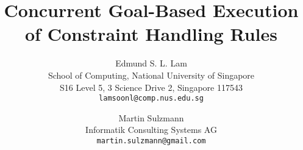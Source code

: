 \documentclass{tlp}
\begin{document}
\def\ruleform#1{{\setlength{\fboxrule}{1pt}\fbox{\normalsize }}}
\newcommand{\ms}[1]{\marginpar{\sc ms}{\bf #1}}

\newcommand{\atsign}{@}

\newcommand{\simparrow}[0]{\Longleftrightarrow}
\newcommand{\proparrow}[0]{\Longrightarrow}
\newcommand{\arrow}[0]{\rightarrow}

\renewcommand{\rlabel}[1]{\mbox{}}
\newcommand{\blabel}[1]{\mbox{\bf (#1)}}
\newcommand{\Leq}{\mathit{Leq}}
\newcommand{\LL}{\mathit{L}}
\newcommand{\Merge}{\mathit{Merge}}
\newcommand{\MM}{\mathit{M}}
\newcommand{\Get}{\mathit{Get}}
\newcommand{\Put}{\mathit{Put}}
\newcommand{\Gcd}{\mathit{Gcd}}
\newcommand{\True}{\mathit{True}}

\newcommand{\ignore}[1]{}

\newcommand{\abssem}{{\cal A}}
\newcommand{\goalsem}{{\cal G}}
\newcommand{\pargoalsem}{{\parallel \cal G}}

\newcommand{\abstrans}{\rightarrowtail_{\cal A}}
\newcommand{\abstransstar}{\rightarrowtail^*_{\cal A}}
\newcommand{\goaltrans}{\rightarrowtail_{\cal G}}
\newcommand{\goaltransstar}{\rightarrowtail^*_{\cal G}}
\newcommand{\partrans}{\rightarrowtail_{\mid\mid\cal G}}
\newcommand{\partransstar}{\rightarrowtail^*_{\mid\mid\cal G}}

\newcommand{\abscup}{\uplus}
\newcommand{\goalcup}{\uplus}
\newcommand{\stcup}{\cup}

\newcommand{\goaltranssf}[1]{\stackrel{#1}{\rightarrowtail_{\cal G}}}
\newcommand{\partranssf}[1]{\stackrel{#1}{\rightarrowtail_{\mid\mid\cal G}}}


\newcommand{\chrstate}[2]{\langle #1\mid#2 \rangle}

\long{}


\title{Concurrent Goal-Based Execution of Constraint Handling Rules}

\author[Edmund S. L. Lam and Martin Sulzmann]{
Edmund S. L. Lam \\
 School of Computing, National University of Singapore \\
 S16 Level 5, 3 Science Drive 2, Singapore 117543 \\
 {\tt lamsoonl@comp.nus.edu.sg} 
 \and 
Martin Sulzmann \\      
 Informatik Consulting Systems AG  \\
 {\tt martin.sulzmann@gmail.com}
}



\pagerange{\pageref{firstpage}--\pageref{lastpage}}
\setcounter{page}{1}
\end{document}
